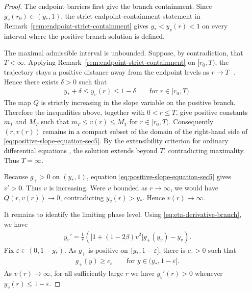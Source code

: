 \documentclass{amsart}
\theoremstyle{plain}
\theoremstyle{mainintrothm}
\theoremstyle{definition}
\begin{document}
	\begin{proof}
		The endpoint barriers first give the branch containment.  Since
		$y_v(r_0)\in(y_*,1)$, the strict endpoint-containment statement in
		Remark~\ref{rem:endpoint-strict-containment} gives $y_*<y_v(r)<1$
		on every interval where the positive branch solution is defined.
		
		\medskip
		
		The maximal admissible interval is unbounded.  Suppose, by
		contradiction, that $T<\infty$.  Applying
		Remark~\ref{rem:endpoint-strict-containment} on $[r_0,T)$, the trajectory stays
		a positive distance away from the endpoint levels as $r\to T^-$.  Hence there
		exists $\delta>0$ such that
		\begin{align*}
			y_*+\delta
			\le
			y_v(r)
			\le
			1-\delta
			\qquad
			\text{for }r\in[r_0,T).
		\end{align*}
		The map $Q$ is strictly increasing in the slope variable on the positive
		branch.  Therefore the inequalities above, together with $0<r\le T$, give
		positive constants $m_T$ and $M_T$ such that $m_T\le v(r)\le M_T$ for $r\in[r_0,T)$. Consequently $(r,v(r))$ remains in a compact subset of the domain of the right-hand side of \eqref{eq:positive-slope-equation-sec5}.  By the
		extensibility criterion for ordinary differential equations
		\cite[Corollary~2.15]{teschl2012ordinary}, the solution extends beyond
		$T$, contradicting maximality.  Thus $T=\infty$.
		
		\medskip
		
		Because $g_+>0$ on $(y_*,1)$, equation
		\eqref{eq:positive-slope-equation-sec5} gives $v'>0$.  Thus $v$ is
		increasing.  Were $v$ bounded as $r\to\infty$, we would have
		$Q(r,v(r))\to0$, contradicting $y_v(r)>y_*$.  Hence $v(r)\to\infty$.
		
		\medskip
		
		It remains to identify the limiting phase level.  Using
		\eqref{eq:eta-derivative-branch}, we have
		\begin{align*}
			y_v'
			=
			\frac{1}{r}
			\left(
			\bigl[1+(1-2\beta)v^2\bigr]g_+(y_v)
			-
			y_v
			\right).
		\end{align*}
		Fix $\varepsilon\in(0,1-y_*)$.  As $g_+$ is positive on
		$(y_*,1-\varepsilon]$, there is $c_\varepsilon>0$ such that
		\begin{align*}
			g_+(y)\ge c_\varepsilon
			\qquad
			\text{for }y\in(y_*,1-\varepsilon].
		\end{align*}
		As $v(r)\to\infty$, for all sufficiently large $r$ we have
		$y_v'(r)>0$ whenever $y_v(r)\le1-\varepsilon$.
		

\end{proof}
\end{document}

